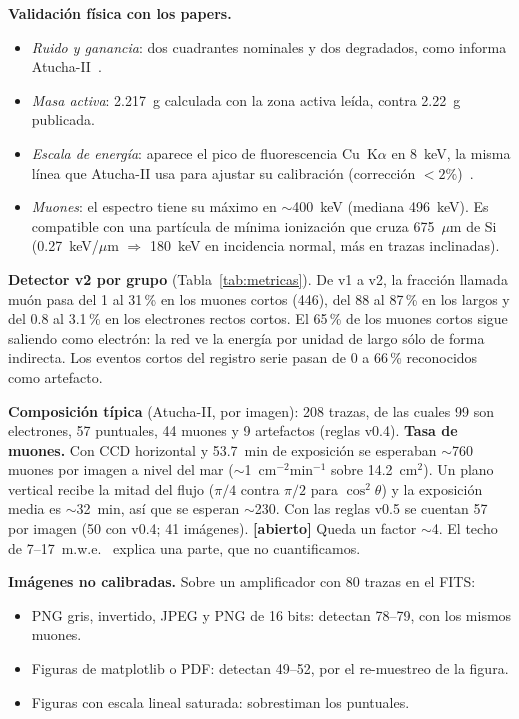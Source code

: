 \documentclass[10pt,a4paper]{article}
\newcommand{\abierto}[1]{\textcolor{orange!80!black}{\textbf{[abierto]} #1}}
\begin{document}
\textbf{Validación física con los papers.}
\begin{itemize}
\item \emph{Ruido y ganancia}: dos cuadrantes nominales y dos degradados, como informa Atucha-II~\cite{depaoli2024}.
\item \emph{Masa activa}: 2.217~g calculada con la zona activa leída, contra 2.22~g publicada.
\item \emph{Escala de energía}: aparece el pico de fluorescencia Cu~K$\alpha$ en 8~keV, la misma línea que
  Atucha-II usa para ajustar su calibración (corrección $<2\%$)~\cite{depaoli2024}.
\item \emph{Muones}: el espectro tiene su máximo en $\sim$400~keV (mediana 496~keV). Es compatible con una
  partícula de mínima ionización que cruza 675~$\mu$m de Si (0.27~keV/$\mu$m $\Rightarrow$ 180~keV en
  incidencia normal, más en trazas inclinadas).
\end{itemize}

\textbf{Detector v2 por grupo} (Tabla~\ref{tab:metricas}). De v1 a v2, la fracción llamada muón pasa del 1 al
31\,\% en los muones cortos (446), del 88 al 87\,\% en los largos y del 0.8 al 3.1\,\% en los electrones rectos
cortos. El 65\,\% de los muones cortos sigue saliendo como electrón: la red ve la energía por unidad de largo
sólo de forma indirecta. Los eventos cortos del registro serie pasan de 0 a 66\,\% reconocidos como artefacto.

\textbf{Composición típica} (Atucha-II, por imagen): 208 trazas, de las cuales 99 son electrones, 57 puntuales,
44 muones y 9 artefactos (reglas v0.4). \textbf{Tasa de muones.} Con CCD horizontal y 53.7~min de
exposición se esperaban $\sim$760 muones por imagen a nivel del mar ($\sim$1~cm$^{-2}$min$^{-1}$ sobre
14.2~cm$^2$). Un plano vertical recibe la mitad del flujo ($\pi/4$ contra $\pi/2$ para $\cos^2\theta$) y la
exposición media es $\sim$32~min, así que se esperan $\sim$230. Con las reglas v0.5 se cuentan 57 por imagen
(50 con v0.4; 41 imágenes). \abierto{Queda un factor $\sim$4. El techo de 7--17~m.w.e.~\cite{depaoli2024}
explica una parte, que no cuantificamos.}

\textbf{Imágenes no calibradas.} Sobre un amplificador con 80 trazas en el FITS:
\begin{itemize}
\item PNG gris, invertido, JPEG y PNG de 16 bits: detectan 78--79, con los mismos muones.
\item Figuras de matplotlib o PDF: detectan 49--52, por el re-muestreo de la figura.
\item Figuras con escala lineal saturada: sobrestiman los puntuales.
\end{itemize}
\end{document}
